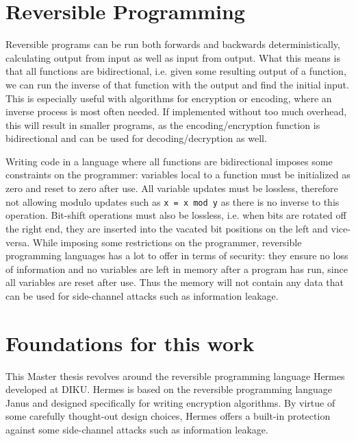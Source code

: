 \section{Reversible Programming}
Reversible programs can be run both forwards and backwards deterministically, calculating output from input as well as input from output.
What this means is that all functions are bidirectional, i.e. given some resulting output of a function, we can run the inverse of that function with the output and find the initial input.
This is especially useful with algorithms for encryption or encoding, where an inverse process is most often needed.
If implemented without too much overhead, this will result in smaller programs, as the encoding/encryption function is bidirectional and can be used for decoding/decryption as well.

Writing code in a language where all functions are bidirectional imposes some constraints on the programmer: variables local to a function must be initialized as zero and reset to zero after use.
All variable updates must be lossless, therefore not allowing modulo updates such as \lstinline{x = x mod y} as there is no inverse to this operation.
Bit-shift operations must also be lossless, i.e. when bits are rotated off the right end, they are inserted into the vacated bit positions on the left and vice-versa. While imposing some restrictions on the programmer, reversible programming languages has a lot to offer in terms of security: they ensure no loss of information and no variables are left in memory after a program has run, since all variables are reset after use. Thus the memory will not contain any data that can be used for side-channel attacks such as information leakage.

\section{Foundations for this work}
This Master thesis revolves around the reversible programming language Hermes developed at DIKU.
Hermes is based on the reversible programming language Janus and designed specifically for writing encryption algorithms\cite{MogensenHermes}.
By virtue of some carefully thought-out design choices, Hermes offers a built-in protection against some side-channel attacks such as information leakage.

